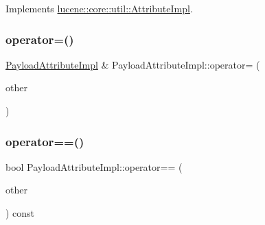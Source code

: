 Implements \mbox{\hyperlink{classlucene_1_1core_1_1util_1_1AttributeImpl_ab032e399d03ce2f58c76881cf2b92325}{lucene\+::core\+::util\+::\+Attribute\+Impl}}.

\mbox{\label{classlucene_1_1core_1_1analysis_1_1tokenattributes_1_1PayloadAttributeImpl_ac5a8e038064f6ee8774df0708467201f}} 
\subsubsection{\texorpdfstring{operator=()}{operator=()}\hspace{0.1cm}{\footnotesize\ttfamily [2/2]}}
{\footnotesize\ttfamily \mbox{\hyperlink{classlucene_1_1core_1_1analysis_1_1tokenattributes_1_1PayloadAttributeImpl}{Payload\+Attribute\+Impl}} \& Payload\+Attribute\+Impl\+::operator= (\begin{DoxyParamCaption}\item[{\mbox{\hyperlink{ZlibCrc32_8h_a2c212835823e3c54a8ab6d95c652660e}{const}} \mbox{\hyperlink{classlucene_1_1core_1_1analysis_1_1tokenattributes_1_1PayloadAttributeImpl}{Payload\+Attribute\+Impl}} \&}]{other }\end{DoxyParamCaption})}

\mbox{\label{classlucene_1_1core_1_1analysis_1_1tokenattributes_1_1PayloadAttributeImpl_a2022641a26ad34c34b75cf47caf2f223}} 
\subsubsection{\texorpdfstring{operator==()}{operator==()}}
{\footnotesize\ttfamily bool Payload\+Attribute\+Impl\+::operator== (\begin{DoxyParamCaption}\item[{\mbox{\hyperlink{ZlibCrc32_8h_a2c212835823e3c54a8ab6d95c652660e}{const}} \mbox{\hyperlink{classlucene_1_1core_1_1analysis_1_1tokenattributes_1_1PayloadAttributeImpl}{Payload\+Attribute\+Impl}} \&}]{other }\end{DoxyParamCaption}) const}

